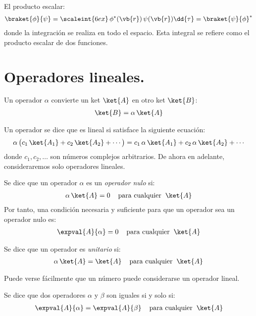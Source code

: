 \noindent
El producto escalar:
\begin{align}
\braket{\phi}{\psi} = \scaleint{6ex} \, \phi^{*} (\vb{r}) \, \psi (\vb{r}) \dd{\tau} = \braket{\psi}{\phi}^{*}
\label{eq:ecuacion_08}
\end{align}
donde la integración se realiza en todo el espacio. Esta integral se refiere como el producto escalar de dos funciones.

\section{Operadores lineales.}

Un operador $\alpha$ convierte un ket $\ket{A}$ en otro ket $\ket{B}$:
\begin{align}
\ket{B} = \alpha \, \ket{A}
\label{eq:ecuacion_09}
\end{align}

Un operador se dice que es lineal si satisface la siguiente ecuación:
\begin{align}
\alpha \, \big( c_{1} \, \ket{A_{1}} + c_{2} \, \ket{A_{2}} + \cdots  \big) = c_{1} \, \alpha \, \ket{A_{1}} + c_{2} \, \alpha \, \ket{A_{2}} + \cdots
\label{eq:ecuacion_10}
\end{align}
donde $c_{1}, c_{2}, \ldots$ son números complejos arbitrarios. De ahora en adelante, consideraremos solo operadores lineales.
\par
Se dice que un operador $\alpha$ es un \emph{operador nulo} si:
\begin{align}
\alpha \, \ket{A} = 0 \hspace{0.4cm} \mbox{para cualquier} \hspace{0.2cm} \ket{A}
\label{eq:ecuacion_11}
\end{align}
Por tanto, una condición necesaria y suficiente para que un operador sea un operador nulo es:
\begin{align}
\expval{A}{\alpha} = 0 \hspace{0.4cm} \mbox{para cualquier} \hspace{0.2cm} \ket{A}
\end{align}

Se dice que un operador es \emph{unitario} si:
\begin{align}
\alpha \, \ket{A} = \ket{A} \hspace{0.4cm} \mbox{para cualquier} \hspace{0.2cm} \ket{A}
\label{eq:ecuacion_13}
\end{align}

Puede verse fácilmente que un número puede considerarse un operador lineal.
\par
Se dice que dos operadores $\alpha$ y $\beta$ son iguales si y solo si:
\begin{align}
\expval{A}{\alpha} = \expval{A}{\beta} \hspace{0.4cm} \mbox{para cualquier} \hspace{0.2cm} \ket{A}
\label{eq:ecuacion_14}
\end{align}

